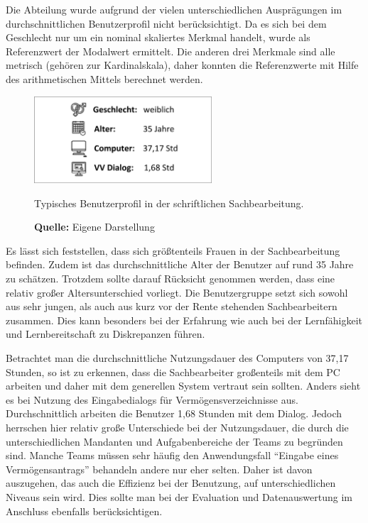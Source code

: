 Die Abteilung wurde aufgrund der vielen unterschiedlichen Ausprägungen im durchschnittlichen Benutzerprofil nicht berücksichtigt. Da es sich bei dem Geschlecht nur um ein nominal skaliertes Merkmal handelt, wurde als Referenzwert der Modalwert ermittelt. Die anderen drei Merkmale sind alle metrisch (gehören zur Kardinalskala), daher konnten die Referenzwerte mit Hilfe des arithmetischen Mittels berechnet werden.
\begin{figure}[H]
  \centering
  \includegraphics[width=250px]{img/durchschnittliches_Benutzerprofil.png}
  \caption{Typisches Benutzerprofil in der schriftlichen Sachbearbeitung.}
  \caption*{\textbf{Quelle:} Eigene Darstellung}
  \label{fig:durchschnittlichesBenutzerprofil}
\end{figure}
Es lässt sich feststellen, dass sich größtenteils Frauen in der Sachbearbeitung befinden. Zudem ist das durchschnittliche Alter der Benutzer auf rund 35 Jahre zu schätzen. Trotzdem sollte darauf Rücksicht genommen werden, dass eine relativ großer Altersunterschied vorliegt. Die Benutzergruppe setzt sich sowohl aus sehr jungen, als auch aus kurz vor der Rente stehenden Sachbearbeitern zusammen. Dies kann besonders bei der Erfahrung wie auch bei der Lernfähigkeit und Lernbereitschaft zu Diskrepanzen führen.

Betrachtet man die durchschnittliche Nutzungsdauer des Computers von 37,17 Stunden, so ist zu erkennen, dass die Sachbearbeiter großenteils mit dem PC arbeiten und daher mit dem generellen System vertraut sein sollten. Anders sieht es bei Nutzung des Eingabedialogs für Vermögensverzeichnisse aus. Durchschnittlich arbeiten die Benutzer 1,68 Stunden mit dem Dialog. Jedoch herrschen hier relativ große Unterschiede bei der Nutzungsdauer, die durch die unterschiedlichen Mandanten und Aufgabenbereiche der Teams zu begründen sind. Manche Teams müssen sehr häufig den Anwendungsfall \enquote{Eingabe eines Vermögensantrags} behandeln andere nur eher selten. Daher ist davon auszugehen, das auch die Effizienz bei der Benutzung, auf unterschiedlichen Niveaus sein wird. Dies sollte man bei der Evaluation und Datenauswertung im Anschluss ebenfalls berücksichtigen.


